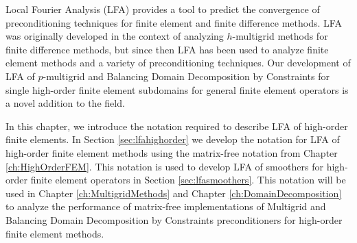 Local Fourier Analysis (LFA) provides a tool to predict the convergence of preconditioning techniques for finite element and finite difference methods.
LFA \cite{brandt1977multi} was originally developed in the context of analyzing $h$-multigrid methods for finite difference methods, but since then LFA has been used to analyze finite element methods and a variety of preconditioning techniques.
Our development of LFA of $p$-multigrid and Balancing Domain Decomposition by Constraints for single high-order finite element subdomains for general finite element operators is a novel addition to the field.

In this chapter, we introduce the notation required to describe LFA of high-order finite elements.
In Section \ref{sec:lfahighorder} we develop the notation for LFA of high-order finite element methods using the matrix-free notation from Chapter \ref{ch:HighOrderFEM}.
This notation is used to develop LFA of smoothers for high-order finite element operators in Section \ref{sec:lfasmoothers}.
This notation will be used in Chapter \ref{ch:MultigridMethods} and Chapter \ref{ch:DomainDecomposition} to analyze the performance of matrix-free implementations of Multigrid and Balancing Domain Decomposition by Constraints preconditioners for high-order finite element methods.